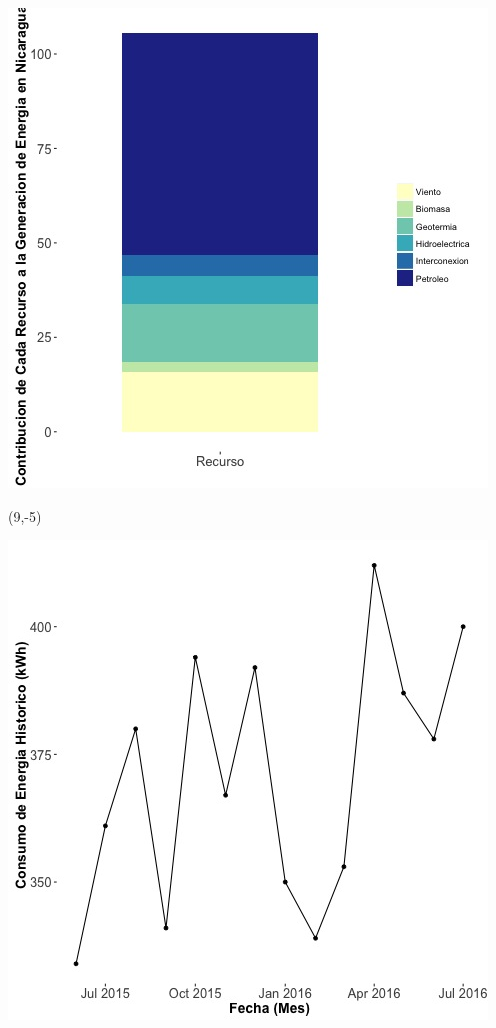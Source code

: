 \documentclass{article}\usepackage[]{graphicx}\usepackage[]{color}
\newenvironment{knitrout}{}{} %
\begin{document}
\begin{knitrout}
\color{fgcolor}
\includegraphics[scale=0.65]{figure/gridplot2.jpg} 
\end{knitrout}

 \begin{textblock}{1}(9,-5)
\begin{minipage}{20em}
\begingroup

\endgroup
\end{minipage}
\end{textblock}

\begin{knitrout}
\color{fgcolor}
\includegraphics[scale=0.65]{figure/A16_historico_energia} 
\end{knitrout}
\end{document}
